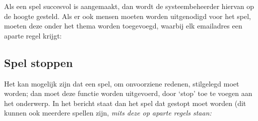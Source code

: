 \documentclass[12pt]{article}
\begin{document}
    Als een spel succesvol is aangemaakt, dan wordt de systeembeheerder hiervan op de hoogte gesteld. Als er ook mensen moeten worden uitgenodigd voor het spel, moeten deze onder het thema worden toegevoegd, waarbij elk emailadres een aparte regel krijgt:
    
    \begin{center}
    \end{center}
  
  \subsection{Spel stoppen}
  
    Het kan mogelijk zijn dat een spel, om onvoorziene redenen, stilgelegd moet worden; dan moet deze functie worden uitgevoerd, door `stop' toe te voegen aan het onderwerp. In het bericht staat dan het spel dat gestopt moet worden (dit kunnen ook meerdere spellen zijn, \emph{mits deze op aparte regels staan:}
    
    \begin{center}
    \end{center}
    
\end{document}
